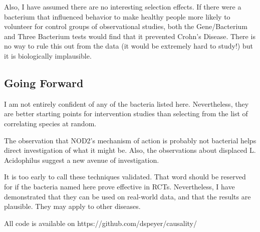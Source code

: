 \documentclass[a4paper]{article}
\begin{document}
Also, I have assumed there are no interesting selection effects.  If
there were a bacterium that influenced behavior to make healthy people
more likely to volunteer for control groups of observational studies,
both the Gene/Bacterium and Three Bacterium tests would find that it
prevented Crohn's Disease.  There is no way to rule this out from the
data (it would be extremely hard to study!) but it is biologically
implausible.

\subsection{Going Forward}

I am not entirely confident of any of the bacteria listed here.
Nevertheless, they are better starting points for intervention studies
than selecting from the list of correlating species at random.

The observation that NOD2's mechanism of action is probably not
bacterial helps direct investigation of what it might be.  Also, the
observations about displaced L. Acidophilus suggest a new avenue of
investigation.

It is too early to call these techniques validated.  That word should
be reserved for if the bacteria named here prove effective in RCTs.
Nevertheless, I have demonstrated that they can be used on real-world
data, and that the results are plausible.  They may apply to other
diseases.

All code is available on https://github.com/dspeyer/causality/
\end{document}
